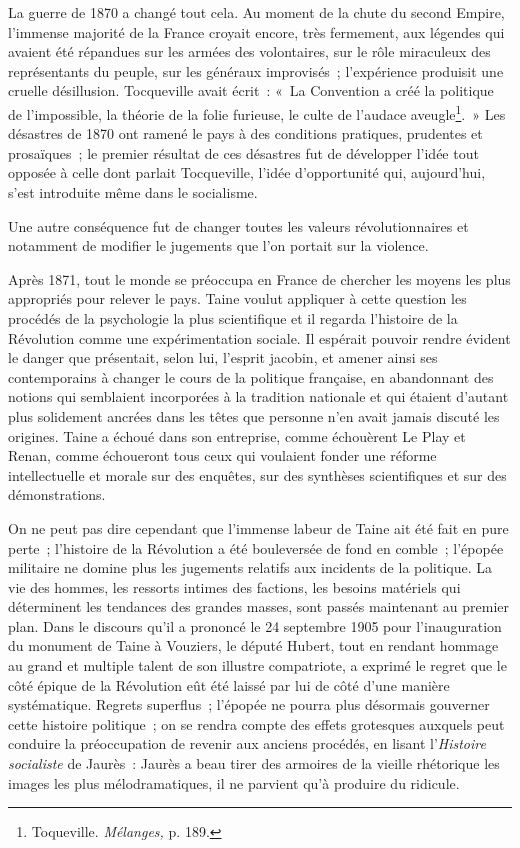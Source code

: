 \documentclass[french,twoside]{book} %
\begin{document}
\noindent La guerre de 1870 a changé tout cela. Au moment de la chute du second Empire, l’immense majorité de la France croyait encore, très fermement, aux légendes  qui avaient été répandues sur les armées des volontaires, sur le rôle miraculeux des représentants du peuple, sur les généraux improvisés ; l’expérience produisit une cruelle désillusion. Tocqueville avait écrit : « La Convention a créé la politique de l’impossible, la théorie de la folie furieuse, le culte de l’audace aveugle\footnote{ \noindent Toqueville. \emph{Mélanges,} p. 189.
 }. » Les désastres de 1870 ont ramené le pays à des conditions pratiques, prudentes et prosaïques ; le premier résultat de ces désastres fut de développer l’idée tout opposée à celle dont parlait Tocqueville, l’idée d’opportunité qui, aujourd’hui, s’est introduite même dans le socialisme.\par
Une autre conséquence fut de changer toutes les valeurs révolutionnaires et notamment de modifier le jugements que l’on portait sur la violence.\par
Après 1871, tout le monde se préoccupa en France de chercher les moyens les plus appropriés pour relever le pays. Taine voulut appliquer à cette question les procédés de la psychologie la plus scientifique et il regarda l’histoire de la Révolution comme une expérimentation sociale. Il espérait pouvoir rendre évident le danger que présentait, selon lui, l’esprit jacobin, et amener ainsi ses contemporains à changer le cours de la politique française, en abandonnant des notions qui semblaient incorporées à la tradition nationale et qui étaient d’autant plus solidement ancrées dans les têtes que personne n’en avait jamais discuté les origines. Taine a échoué dans son entreprise, comme échouèrent Le Play et Renan, comme échoueront tous ceux qui voulaient fonder une réforme  intellectuelle et morale sur des enquêtes, sur des synthèses scientifiques et sur des démonstrations.\par
On ne peut pas dire cependant que l’immense labeur de Taine ait été fait en pure perte ; l’histoire de la Révolution a été bouleversée de fond en comble ; l’épopée militaire ne domine plus les jugements relatifs aux incidents de la politique. La vie des hommes, les ressorts intimes des factions, les besoins matériels qui déterminent les tendances des grandes masses, sont passés maintenant au premier plan. Dans le discours qu’il a prononcé le 24 septembre 1905 pour l’inauguration du monument de Taine à Vouziers, le député Hubert, tout en rendant hommage au grand et multiple talent de son illustre compatriote, a exprimé le regret que le côté épique de la Révolution eût été laissé par lui de côté d’une manière systématique. Regrets superflus ; l’épopée ne pourra plus désormais gouverner cette histoire politique ; on se rendra compte des effets grotesques auxquels peut conduire la préoccupation de revenir aux anciens procédés, en lisant l’\emph{Histoire socialiste} de Jaurès : Jaurès a beau tirer des armoires de la vieille rhétorique les images les plus mélodramatiques, il ne parvient qu’à produire du ridicule.\par
\end{document}
